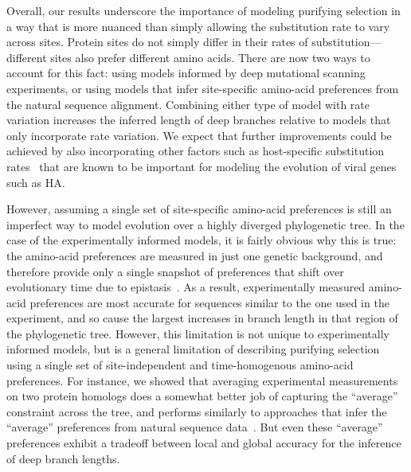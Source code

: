 \documentclass[11pt]{article}
\begin{document}
Overall, our results underscore the importance of modeling purifying selection in a way that is more nuanced than simply allowing the substitution rate to vary across sites.
Protein sites do not simply differ in their rates of substitution---different sites also prefer different amino acids.
There are now two ways to account for this fact: using models informed by deep mutational scanning experiments, or using models that infer site-specific amino-acid preferences from the natural sequence alignment.
Combining either type of model with rate variation increases the inferred length of deep branches relative to models that only incorporate rate variation.
We expect that further improvements could be achieved by also incorporating other factors such as host-specific substitution rates~\citep{worobey2014synchronized} that are known to be important for modeling the evolution of viral genes such as HA.

However, assuming a single set of site-specific amino-acid preferences is still an imperfect way to model evolution over a highly diverged phylogenetic tree. 
In the case of the experimentally informed models, it is fairly obvious why this is true: the amino-acid preferences are measured in just one genetic background, and therefore provide only a single snapshot of preferences that shift over evolutionary time due to epistasis~\citep{pollock2012amino, shah2015contingency, bazykin2015changing, haddox2018mapping, starr2018pervasive, doud2015site}. 
As a result, experimentally measured amino-acid preferences are most accurate for sequences similar to the one used in the experiment, and so cause the largest increases in branch length in that region of the phylogenetic tree.
However, this limitation is not unique to experimentally informed models, but is a general limitation of describing purifying selection using a single set of site-independent and time-homogenous amino-acid preferences.
For instance, we showed that averaging experimental measurements on two protein homologs does a somewhat better job of capturing the ``average'' constraint across the tree, and performs similarly to approaches that infer the ``average'' preferences from natural sequence data~\citep{rodrigue2010mutation,rodrigue2014site}.
But even these ``average'' preferences exhibit a tradeoff between local and global accuracy for the inference of deep branch lengths.
\end{document}

